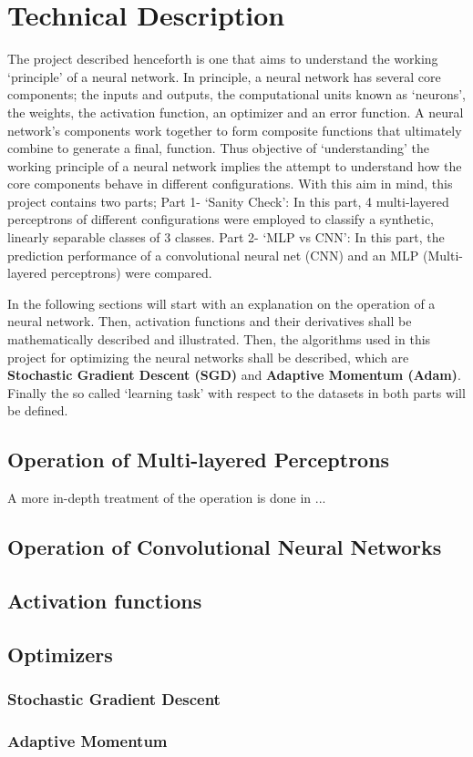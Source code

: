 \section{Technical Description}

The project described henceforth is one that aims to understand the working `principle' of a neural network. In principle,
a neural network has several core components; the inputs and outputs, the computational units known as `neurons', 
the weights, the activation function, an optimizer and an error function. A neural network's components work together 
to form composite functions that ultimately combine to generate a final, function. Thus objective of `understanding' 
the working principle of a neural network implies the attempt to understand how the core components behave in different
configurations. With this aim in mind, this project contains two parts; Part 1- `Sanity Check': In this part, 
4 multi-layered perceptrons of different configurations were employed to classify a synthetic, linearly separable 
classes of 3 classes. Part 2- `MLP vs CNN': In this part, the prediction performance of a convolutional neural net (CNN)
and an MLP (Multi-layered perceptrons) were compared. 

In the following sections will start with an explanation on the operation of a neural network. Then, activation
functions and their derivatives shall be mathematically described and illustrated. Then, the algorithms used 
in this project for optimizing the neural networks shall be described, which are
\textbf{Stochastic Gradient Descent (SGD)} and \textbf{Adaptive Momentum (Adam)}. Finally the so called `learning task' 
with respect to the datasets in both parts will be defined.

\subsection{Operation of Multi-layered Perceptrons}

A more in-depth treatment of the operation is done in ...

\subsection{Operation of Convolutional Neural Networks}

\subsection{Activation functions}

\subsection{Optimizers}

\subsubsection{Stochastic Gradient Descent}

\subsubsection{Adaptive Momentum}
